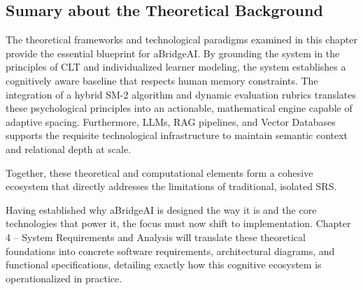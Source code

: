 \subsection{Sumary about the Theoretical Background}
The theoretical frameworks and technological paradigms examined in this chapter provide the essential blueprint for aBridgeAI. By grounding the system in the principles of CLT and individualized learner modeling, the system establishes a cognitively aware baseline that respects human memory constraints. The integration of a hybrid SM-2 algorithm and dynamic evaluation rubrics translates these psychological principles into an actionable, mathematical engine capable of adaptive spacing. Furthermore, LLMs, RAG pipelines, and Vector Databases supports the requisite technological infrastructure to maintain semantic context and relational depth at scale. 

Together, these theoretical and computational elements form a cohesive ecosystem that directly addresses the limitations of traditional, isolated SRS.

Having established why aBridgeAI is designed the way it is and the core technologies that power it, the focus must now shift to implementation. Chapter 4 – System Requirements and Analysis will translate these theoretical foundations into concrete software requirements, architectural diagrams, and functional specifications, detailing exactly how this cognitive ecosystem is operationalized in practice.